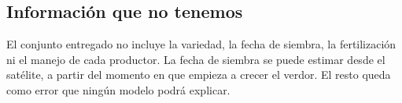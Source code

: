 \subsection{Información que no tenemos}
El conjunto entregado no incluye la variedad, la fecha de siembra, la fertilización ni el manejo de cada productor.
La fecha de siembra se puede estimar desde el satélite, a partir del momento en que empieza a crecer el verdor. El
resto queda como error que ningún modelo podrá explicar.
